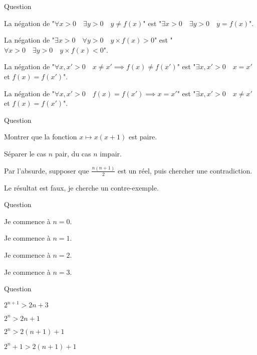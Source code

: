 \begin{multi}[multiple,feedback=
{La négation du "\(\forall x > 0 \quad \exists y > 0 \ldots\)" commence par "\(\exists x > 0 \quad \forall y > 0\).
La négation de "\(f(x) = f(x') \implies x = x'\)" est "\(f(x) = f(x')\) et \(x \neq x'\)".
}]{Question}
    \item La négation de "\(\forall x > 0 \quad \exists y > 0 \quad y \neq f(x)\)" est "\(\exists x > 0 \quad \exists y > 0 \quad y = f(x)\)".
    \item La négation de "\(\exists x > 0 \quad \forall y > 0 \quad y \times f(x)>0\)" est "\(\forall x > 0 \quad \exists y > 0 \quad y\times f(x) < 0\)".
    \item La négation de "\(\forall x,x' > 0 \quad x \neq x' \implies f(x) \neq f(x')\)" est "\(\exists x,x' > 0 \quad x = x'\) et \(f(x) = f(x')\)".
    \item* La négation de "\(\forall x,x' > 0 \quad f(x) = f(x') \implies x = x'\)" est "\(\exists x,x' > 0 \quad x \neq x'\) et \(f(x) = f(x')\)".
\end{multi}


\begin{multi}[multiple,feedback=
{Séparer le cas \(n\) pair, du cas \(n\) impair. Dans le premier cas, on peut écrire \(n=2k\) (avec \(k\in \Nn\)), dans le second cas \(n=2k+1\), puis calculer \(\frac{n(n+1)}{2}\). 
}]{Question}
    \item Montrer que la fonction \(x \mapsto x(x+1)\) est paire.
    \item* Séparer le cas \(n\) pair, du cas \(n\) impair.
    \item Par l'absurde, supposer que \(\frac{n(n+1)}{2}\) est un réel, puis chercher une contradiction.
    \item Le résultat est faux, je cherche un contre-exemple.
\end{multi}


\begin{multi}[multiple,feedback=
{L'initialisation peut commencer à n'importe quel entier \(n_0 \ge 3\).
}]{Question}
    \item Je commence à \(n=0\).
    \item Je commence à \(n=1\).
    \item Je commence à \(n=2\).
    \item* Je commence à \(n=3\).
\end{multi}


\begin{multi}[multiple,feedback=
{\(H_{n+1}\) s'écrit \(2^{n+1} > 2(n+1)+1\), c'est-à-dire \(2^{n+1} > 2n+3\).
}]{Question}
    \item* \(2^{n+1} > 2n+3\)
    \item \(2^{n} > 2n+1\)
    \item \(2^{n} > 2(n+1)+1\)
    \item \(2^{n}+1 > 2(n+1)+1\)
\end{multi}



